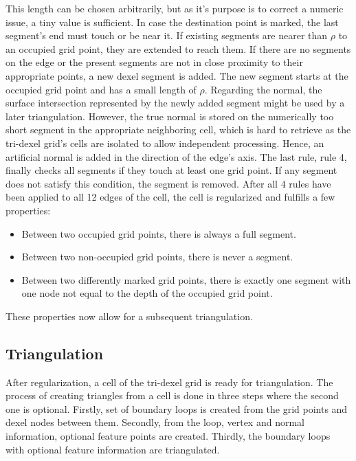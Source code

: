 This length can be chosen arbitrarily, but as it's purpose is to correct a numeric issue, a tiny value is sufficient.
In case the destination point is marked, the last segment's end must touch or be near it.
If existing segments are nearer than $\rho$ to an occupied grid point, they are extended to reach them.
If there are no segments on the edge or the present segments are not in close proximity to their appropriate points, a new dexel segment is added.
The new segment starts at the occupied grid point and has a small length of $\rho$.
Regarding the normal, the surface intersection represented by the newly added segment might be used by a later triangulation.
However, the true normal is stored on the numerically too short segment in the appropriate neighboring cell, which is hard to retrieve as the tri-dexel grid's cells are isolated to allow independent processing.
Hence, an artificial normal is added in the direction of the edge's axis.
%
The last rule, rule 4, finally checks all segments if they touch at least one grid point.
If any segment does not satisfy this condition, the segment is removed.
%
After all 4 rules have been applied to all 12 edges of the cell, the cell is regularized and fulfills a few properties:
\begin{itemize}
	\item Between two occupied grid points, there is always a full segment.
	\item Between two non-occupied grid points, there is never a segment.
	\item Between two differently marked grid points, there is exactly one segment with one node not equal to the depth of the occupied grid point.
\end{itemize}
These properties now allow for a subsequent triangulation.


\subsection{Triangulation}
\label{sec:tri_dexel_triangulation}

After regularization, a cell of the tri-dexel grid is ready for triangulation.
The process of creating triangles from a cell is done in three steps where the second one is optional.
Firstly, set of boundary loops is created from the grid points and dexel nodes between them.
Secondly, from the loop, vertex and normal information, optional feature points are created.
Thirdly, the boundary loops with optional feature information are triangulated.

